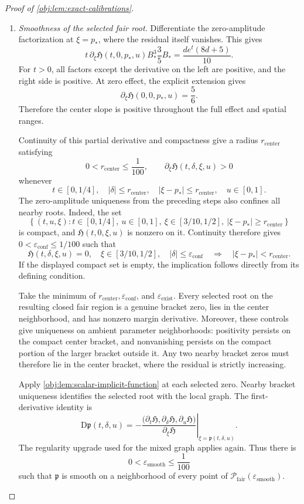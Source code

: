 \begin{proof}[Proof of \cref{obj:lem:exact-calibrations}]
\begin{enumerate}
\item \emph{Smoothness of the selected fair root.}
Differentiate the zero-amplitude factorization at \(\xi=p_*\), where the residual itself vanishes. This gives
\[
t\,\partial_\xi\mathfrak H(t,0,p_*,u)
B_*^3\frac35B_*
=
\frac{de^t(8d+5)}{10}.
\]
For \(t>0\), all factors except the derivative on the left are positive, and the right side is positive. At zero effect, the explicit extension gives
\[
\partial_\xi\mathfrak H(0,0,p_*,u)=\frac56.
\]
Therefore the center slope is positive throughout the full effect and spatial ranges.

Continuity of this partial derivative and compactness give a radius
\(r_{\mathrm{center}}\) satisfying
\[
0<r_{\mathrm{center}}\le\frac1{100},
\qquad
\partial_\xi\mathfrak H(t,\delta,\xi,u)>0
\]
whenever
\[
t\in[0,1/4],\quad
|\delta|\le r_{\mathrm{center}},\quad
|\xi-p_*|\le r_{\mathrm{center}},\quad
u\in[0,1].
\]
The zero-amplitude uniqueness from the preceding steps also confines all nearby roots. Indeed, the set
\[
\left\{
(t,u,\xi):
t\in[0,1/4],\ u\in[0,1],\
\xi\in[3/10,1/2],\
|\xi-p_*|\ge r_{\mathrm{center}}
\right\}
\]
is compact, and \(\mathfrak H(t,0,\xi,u)\) is nonzero on it. Continuity therefore gives
\(0<\varepsilon_{\mathrm{conf}}\le1/100\) such that
\[
\mathfrak H(t,\delta,\xi,u)=0,\quad
\xi\in[3/10,1/2],\quad
|\delta|\le\varepsilon_{\mathrm{conf}}
\quad\Longrightarrow\quad
|\xi-p_*|<r_{\mathrm{center}}.
\]
If the displayed compact set is empty, the implication follows directly from its defining condition.

Take the minimum of
\(r_{\mathrm{center}},\varepsilon_{\mathrm{conf}}\), and
\(\varepsilon_{\mathrm{exist}}\). Every selected root on the resulting closed fair region is a genuine bracket zero, lies in the center neighborhood, and has nonzero margin derivative. Moreover, these controls give uniqueness on ambient parameter neighborhoods: positivity persists on the compact center bracket, and nonvanishing persists on the compact portion of the larger bracket outside it. Any two nearby bracket zeros must therefore lie in the center bracket, where the residual is strictly increasing.

Apply \cref{obj:lem:scalar-implicit-function} at each selected zero. Nearby bracket uniqueness identifies the selected root with the local graph. The first-derivative identity is
\[
\mathrm D\mathfrak p(t,\delta,u)
=
-\left.
\frac{
\bigl(\partial_t\mathfrak H,
      \partial_\delta\mathfrak H,
      \partial_u\mathfrak H\bigr)}
{\partial_\xi\mathfrak H}
\right|_{\xi=\mathfrak p(t,\delta,u)} .
\]
The regularity upgrade used for the mixed graph applies again. Thus there is
\[
0<\varepsilon_{\mathrm{smooth}}\le\frac1{100}
\]
such that \(\mathfrak p\) is smooth on a neighborhood of every point of
\(\mathcal P_{\mathrm{fair}}(\varepsilon_{\mathrm{smooth}})\).


\end{enumerate}
\end{proof}
